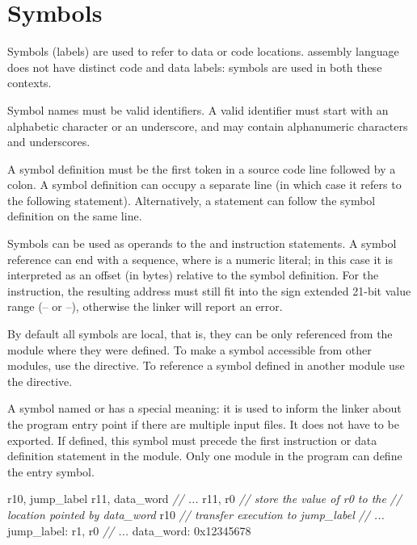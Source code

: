 \documentclass[a4paper,12pt,twoside,extrafontsizes]{memoir}
\begin{document}
\section{Symbols}
\label{sec:symbols}

Symbols (labels) are used to refer to data or code locations. \lxp{} assembly language does not have distinct code and data labels: symbols are used in both these contexts.

Symbol names must be valid identifiers. A valid identifier must start with an alphabetic character or an underscore, and may contain alphanumeric characters and underscores.

A symbol definition must be the first token in a source code line followed by a colon. A symbol definition can occupy a separate line (in which case it refers to the following statement). Alternatively, a statement can follow the symbol definition on the same line.

Symbols can be used as operands to the  and  instruction statements. A symbol reference can end with a  sequence, where  is a numeric literal; in this case it is interpreted as an offset (in bytes) relative to the symbol definition. For the  instruction, the resulting address must still fit into the sign extended 21-bit value range (-- or --), otherwise the linker will report an error.

By default all symbols are local, that is, they can be only referenced from the module where they were defined. To make a symbol accessible from other modules, use the  directive. To reference a symbol defined in another module use the  directive.

A symbol named  or  has a special meaning: it is used to inform the linker about the program entry point if there are multiple input files. It does not have to be exported. If defined, this symbol must precede the first instruction or data definition statement in the module. Only one module in the program can define the entry symbol.

\begin{codeparbreakable}
     r10, jump\_label
     r11, data\_word
\emph{// ...}
     r11, r0 \emph{// store the value of r0 to the}
               \emph{// location pointed by data\_word}
     r10    \emph{// transfer execution to jump\_label}
\emph{// ...}
jump\_label:
     r1, r0
\emph{// ...}
data\_word:
     0x12345678
\end{codeparbreakable}
\end{document}
